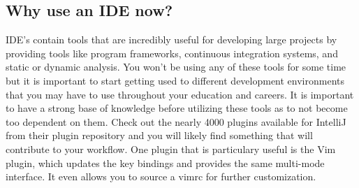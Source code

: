\documentclass[../../main.tex]{subfiles}
\begin{document}
\subsection{Why use an IDE now?}
IDE's contain tools that are incredibly useful for developing large projects by providing tools like program frameworks,
continuous integration systems, and static or dynamic analysis. You won't be using any of these tools for some time but
it is important to start getting used to different development environments that you may have to use throughout your
education and careers. It is important to have a strong base of knowledge before utilizing these tools as to not become
too dependent on them. Check out the nearly 4000 plugins available for IntelliJ from their plugin repository and you
will likely find something that will contribute to your workflow. One plugin that is particulary useful is the Vim plugin,
which updates the key bindings and provides the same multi-mode interface. It even allows you to source a vimrc for further
customization.
\end{document}
